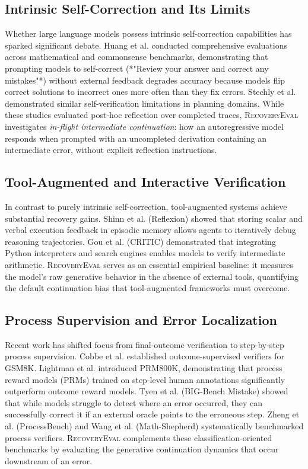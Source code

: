 \documentclass[11pt,letterpaper]{article}
\newcommand{\framework}{\textsc{RecoveryEval}}
\begin{document}
\subsection{Intrinsic Self-Correction and Its Limits}
Whether large language models possess intrinsic self-correction capabilities has sparked significant debate. Huang et al. \cite{huang2023large} conducted comprehensive evaluations across mathematical and commonsense benchmarks, demonstrating that prompting models to self-correct (*"Review your answer and correct any mistakes"*) without external feedback degrades accuracy because models flip correct solutions to incorrect ones more often than they fix errors. Stechly et al. \cite{stechly2024selfverification} demonstrated similar self-verification limitations in planning domains. While these studies evaluated post-hoc reflection over completed traces, \framework{} investigates \textit{in-flight intermediate continuation}: how an autoregressive model responds when prompted with an uncompleted derivation containing an intermediate error, without explicit reflection instructions.

\subsection{Tool-Augmented and Interactive Verification}
In contrast to purely intrinsic self-correction, tool-augmented systems achieve substantial recovery gains. Shinn et al. \cite{shinn2023reflexion} (Reflexion) showed that storing scalar and verbal execution feedback in episodic memory allows agents to iteratively debug reasoning trajectories. Gou et al. \cite{gou2024critic} (CRITIC) demonstrated that integrating Python interpreters and search engines enables models to verify intermediate arithmetic. \framework{} serves as an essential empirical baseline: it measures the model's raw generative behavior in the absence of external tools, quantifying the default continuation bias that tool-augmented frameworks must overcome.

\subsection{Process Supervision and Error Localization}
Recent work has shifted focus from final-outcome verification to step-by-step process supervision. Cobbe et al. \cite{cobbe2021gsm8k} established outcome-supervised verifiers for GSM8K. Lightman et al. \cite{lightman2023process} introduced PRM800K, demonstrating that process reward models (PRMs) trained on step-level human annotations significantly outperform outcome reward models. Tyen et al. \cite{tyen2024bigbenchmistake} (BIG-Bench Mistake) showed that while models struggle to detect where an error occurred, they can successfully correct it if an external oracle points to the erroneous step. Zheng et al. \cite{zheng2024processbench} (ProcessBench) and Wang et al. \cite{wang2024mathshepherd} (Math-Shepherd) systematically benchmarked process verifiers. \framework{} complements these classification-oriented benchmarks by evaluating the generative continuation dynamics that occur downstream of an error.
\end{document}

